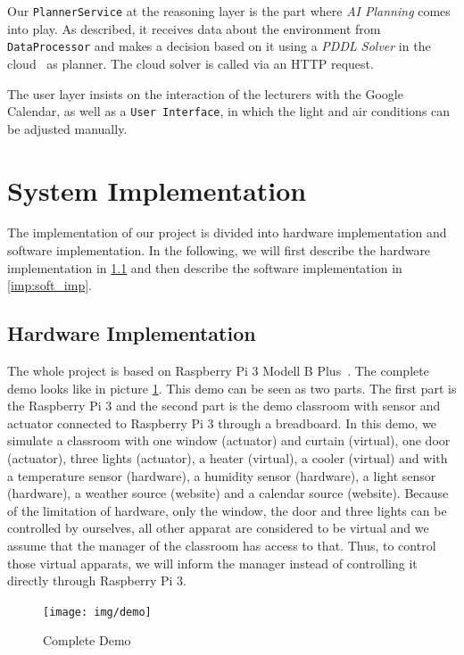 \documentclass[runningheads]{llncs}
\begin{document}
Our \texttt{PlannerService} at the reasoning layer is the part where \textit{AI Planning} comes into play. 
As described, it receives data about the environment from \texttt{DataProcessor} and makes a decision based on it using a \textit{PDDL Solver} in the cloud~\cite{solverpl71:online} as planner.
The cloud solver is called via an HTTP request. 

The user layer insists on the interaction of the lecturers with the Google Calendar, as well as a \texttt{User Interface}, in which the light and air conditions can be adjusted manually.


\section{System Implementation}
\label{sec:imp}
The implementation of our project is divided into hardware implementation and software implementation. In the following, we will first describe the hardware implementation in \ref{imp:hard_imp} and then describe the software implementation in \ref{imp:soft_imp}.

\subsection{Hardware Implementation}
\label{imp:hard_imp}
The whole project is based on Raspberry Pi 3 Modell B Plus~\cite{pi3}. The complete demo looks like in picture \ref{pic:demo}. This demo can be seen as two parts. The first part is the Raspberry Pi 3 and the second part is the demo classroom with sensor and actuator connected to Raspberry Pi 3 through a breadboard. In this demo, we simulate a classroom with one window (actuator) and curtain (virtual), one door (actuator), three lights (actuator), a heater (virtual), a cooler (virtual) and with a temperature sensor (hardware), a humidity sensor (hardware), a light sensor (hardware), a weather source (website) and a calendar source (website). Because of the limitation of hardware, only the window, the door and three lights can be controlled by ourselves, all other apparat are considered to be virtual and we assume that the manager of the classroom has access to that. Thus, to control those virtual apparats, we will inform the manager instead of controlling it directly through Raspberry Pi 3.

\begin{figure}[H]
\centering
\texttt{[image: img/demo]}
\caption{Complete Demo} 
\label{pic:demo}
\end{figure}
\end{document}

